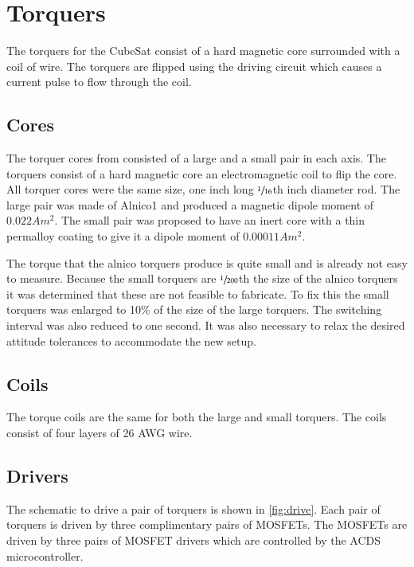 \section{Torquers}

The torquers for the CubeSat consist of a hard magnetic core surrounded with a coil of wire. The torquers are flipped using the driving circuit which causes a current pulse to flow through the coil.

\subsection{Cores}

The torquer cores from \cite{Mentch11} consisted of a large and a small pair in each axis. The torquers consist of a hard magnetic core an electromagnetic coil to flip the core. All torquer cores were the same size, one inch long $\sfrac{1}{16}$th inch diameter rod. The large pair was made of Alnico1 and produced a magnetic dipole moment of $0.022 \unit{A m^2}$. The small pair was proposed to have an inert core with a thin permalloy coating to give it a dipole moment of $0.00011 \unit{A m^2}$.

The torque that the alnico torquers produce is quite small and is already not easy to measure. Because the small torquers are $\sfrac{1}{200}$th the size of the alnico torquers it was determined that these are not feasible to fabricate. To fix this the small torquers was enlarged to 10\% of the size of the large torquers. The switching interval was also reduced to one second. It was also necessary to relax the desired attitude tolerances to accommodate the new setup.

\subsection{Coils}

The torque coils are the same for both the large and small torquers. The coils consist of four layers of 26 AWG wire.

\subsection{Drivers}

The schematic to drive a pair of torquers is shown in \autoref{fig:drive}. Each pair of torquers is driven by three complimentary pairs of \acp{MOSFET}.  The \acp{MOSFET} are driven by three pairs of \ac{MOSFET} drivers which are controlled by the \ac{ACDS} microcontroller.


